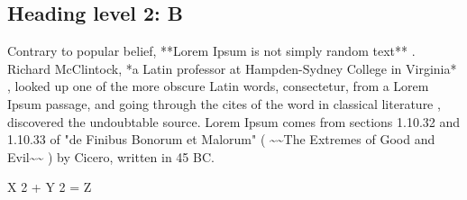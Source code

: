 \documentclass[11pt,a4paper]{article}
\begin{document}
\subsection{Heading level 2: B}

Contrary to popular belief,  **Lorem Ipsum is not simply random text** . Richard McClintock,  *a Latin professor at Hampden-Sydney College in Virginia* , looked up one of the more obscure Latin words, consectetur, from a Lorem Ipsum passage,  and going through the cites of the word in classical literature , discovered the undoubtable source. Lorem Ipsum comes from sections 1.10.32 and 1.10.33 of "de Finibus Bonorum et Malorum" ( \textasciitilde{}\textasciitilde{}The Extremes of Good and Evil\textasciitilde{}\textasciitilde{} ) by Cicero, written in 45 BC.

X 2  + Y 2  = Z
\end{document}
